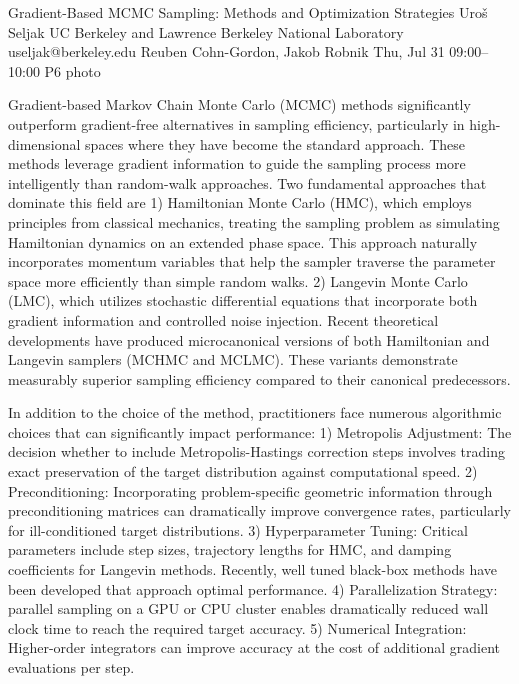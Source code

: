 \clearpage
\begin{talk}
  {Gradient-Based MCMC Sampling: Methods and Optimization Strategies}%
  {Uro\v s Seljak}%
  {UC Berkeley and Lawrence Berkeley National Laboratory}%
  {useljak@berkeley.edu}%
  {Reuben Cohn-Gordon, Jakob Robnik}%
  {}%
  {Thu, Jul 31 09:00–10:00}%
  {P6}%
  {photo}%
  
				
			
\vspace{-5ex}Gradient-based Markov Chain Monte Carlo (MCMC) methods significantly outperform gradient-free alternatives in sampling efficiency, particularly in high-dimensional spaces where they have become the standard approach. These methods leverage gradient information to guide the sampling process more intelligently than random-walk approaches.
Two fundamental approaches that dominate this field are 1)
Hamiltonian Monte Carlo (HMC), which  employs principles from classical mechanics, treating the sampling problem as simulating Hamiltonian dynamics on an extended phase space. This approach naturally incorporates momentum variables that help the sampler traverse the parameter space more efficiently than simple random walks. 2)
Langevin Monte Carlo (LMC), which utilizes stochastic differential equations that incorporate both gradient information and controlled noise injection. 
Recent theoretical developments have produced microcanonical versions of both Hamiltonian and Langevin samplers (MCHMC and MCLMC). These variants demonstrate measurably superior sampling efficiency compared to their canonical predecessors.

In addition to the choice of 
the method, 
practitioners face numerous algorithmic choices that can significantly impact performance:
1) Metropolis Adjustment: The decision whether to include Metropolis-Hastings correction steps involves trading exact preservation of the target distribution against computational speed.
2) Preconditioning: Incorporating problem-specific geometric information through preconditioning matrices can dramatically improve convergence rates, particularly for ill-conditioned target distributions.
3) Hyperparameter Tuning: Critical parameters include step sizes, trajectory lengths for HMC, and damping coefficients for Langevin methods. Recently, well tuned black-box methods have been developed that approach optimal performance. 
4) Parallelization Strategy: parallel sampling on a GPU or CPU cluster enables dramatically reduced wall clock time to reach the required target accuracy. 
5) Numerical Integration: Higher-order integrators can improve accuracy at the cost of additional gradient evaluations per step.


\end{talk}
